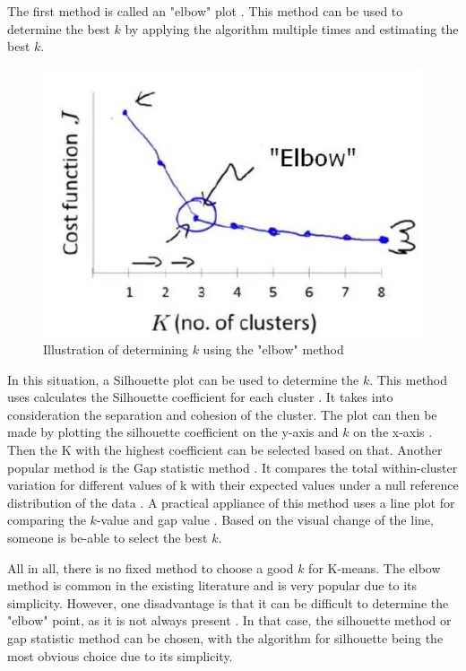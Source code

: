 The first method is called an "elbow" plot \citep{kodinariya_review_2013}.
This method can be used to determine the best $k$ by applying the algorithm multiple times and estimating the best $k$.
\begin{figure}[H]
  \includegraphics{TheorethicalFramework/dentification-of-Elbow-point.png}
  \caption{Illustration of determining $k$ using the "elbow" method \citep{kodinariya_review_2013}}
\end{figure}
In this situation, a Silhouette plot can be used to determine the $k$.
This method uses calculates the Silhouette coefficient for each cluster \citep{saputra_effect_2020}.
It takes into consideration the separation and cohesion of the cluster.
The plot can then be made by plotting the silhouette coefficient on the y-axis and $k$ on the x-axis \citep{saputra_effect_2020}.
Then the K with the highest coefficient can be selected based on that. \newline
Another popular method is the Gap statistic method \citep{yuan_research_2019}.
It compares the total within-cluster variation for different values of k with their expected values under a null reference distribution of the data \citep{tibshirani_estimating_2001}.
A practical appliance of this method uses a line plot for comparing the $k$-value and gap value \citep{yuan_research_2019}.
Based on the visual change of the line, someone is be-able to select the best $k$.

All in all, there is no fixed method to choose a good $k$ for K-means.
The elbow method is common in the existing literature and is very popular due to its simplicity.
However, one disadvantage is that it can be difficult to determine the "elbow" point, as it is not always present \citep{kodinariya_review_2013}.
In that case, the silhouette method or gap statistic method can be chosen, with the algorithm for silhouette being the most obvious choice due to its simplicity. \newpage
